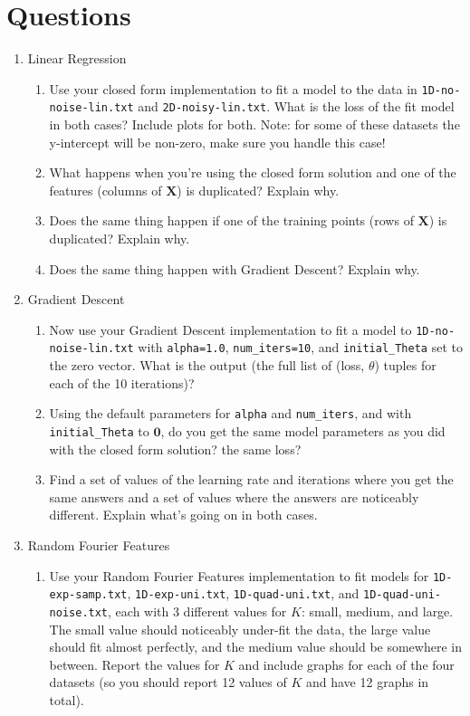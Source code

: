 \documentclass{article} %
\begin{document}
\section*{Questions}
\begin{enumerate}
	\item Linear Regression
	\begin{enumerate}
		\item Use your closed form implementation to fit a model to the data in \texttt{1D-no-noise-lin.txt} and 
		\texttt{2D-noisy-lin.txt}. What is the loss of the fit model in both cases? Include plots for both. Note: for some of 
		these datasets the y-intercept will be non-zero, make sure you handle this case!
		\item What happens when you're using the closed form solution and one of the features (columns of \(\textbf{X}\)) is 
		duplicated? Explain why.
		\item Does the same thing happen if one of the training points (rows of \(\textbf{X}\)) is duplicated? Explain why.
		\item Does the same thing happen with Gradient Descent? Explain why.
	\end{enumerate}
	\item Gradient Descent
	\begin{enumerate}
		\item Now use your Gradient Descent implementation to fit a model to \texttt{1D-no-noise-lin.txt} with 
		\texttt{alpha=1.0}, \texttt{num\_iters=10}, and \texttt{initial\_Theta} set to the zero vector. What is the output 
		(the full list of (loss, \(\theta\)) tuples for each of the 10 iterations)?
		
		\item Using the default parameters for \texttt{alpha} and \texttt{num\_iters}, and with \texttt{initial\_Theta} to 
		\(\mathbf{0}\), do you get the same model parameters as you did with the closed form solution? the same loss? 
		
		\item Find a set of values of the learning rate and iterations where you get the same answers and a set of values 
		where the answers are noticeably different. Explain what's going on in both cases.
	\end{enumerate}
	\item Random Fourier Features
	\begin{enumerate}
		\item Use your Random Fourier Features implementation to fit models for \texttt{1D-exp-samp.txt}, 
		\texttt{1D-exp-uni.txt}, \texttt{1D-quad-uni.txt}, and \texttt{1D-quad-uni-noise.txt}, each with 3 different values 
		for \(K\): small, medium, and large. The small value should noticeably under-fit the data, the large value should fit 
		almost perfectly, and the medium value should be somewhere in between. Report the values for \(K\) and include graphs 
		for each of the four datasets (so you should report 12 values of \(K\) and have 12 graphs in total).


\end{enumerate}
\end{enumerate}
\end{document}
